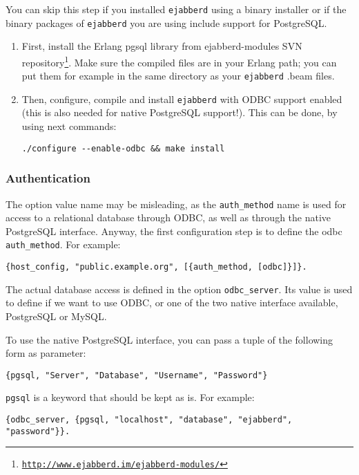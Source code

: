 \documentclass[a4paper,10pt]{book}
\newcommand{\ind}[1]{\begin{latexonly}\index{#1}\end{latexonly}}
\newcommand{\term}[1]{\texttt{#1}}
\newcommand{\ejabberd}{\texttt{ejabberd}}
\gdef\footahref#1#2{#2\footnote{\href{#1}{\texttt{#1}}}}
\begin{document}
You can skip this step if you installed \ejabberd{} using a binary installer or
if the binary packages of \ejabberd{} you are using include support for
PostgreSQL.

\begin{enumerate}
\item First, install the Erlang pgsql library from
  \footahref{http://www.ejabberd.im/ejabberd-modules/}{ejabberd-modules SVN repository}. 
  Make sure the compiled
  files are in your Erlang path; you can put them for example in the same
  directory as your \ejabberd{} .beam files.
\item Then, configure, compile and install \ejabberd{} with ODBC support enabled
  (this is also needed for native PostgreSQL support!). This can be done, by
  using next commands:
  \begin{verbatim}
./configure --enable-odbc && make install
\end{verbatim}
\end{enumerate}

\subsubsection{Authentication}
\label{pgsqlauth}
\ind{PostgreSQL!authentication}

The option value name may be misleading, as the \term{auth\_method} name is used
for access to a relational database through ODBC, as well as through the native
PostgreSQL interface. Anyway, the first configuration step is to define the odbc
\term{auth\_method}. For example:
\begin{verbatim}
{host_config, "public.example.org", [{auth_method, [odbc]}]}.
\end{verbatim}

The actual database access is defined in the option \term{odbc\_server}. Its
value is used to define if we want to use ODBC, or one of the two native
interface available, PostgreSQL or MySQL.

To use the native PostgreSQL interface, you can pass a tuple of the following
form as parameter:
\begin{verbatim}
{pgsql, "Server", "Database", "Username", "Password"}
\end{verbatim}

\term{pgsql} is a keyword that should be kept as is. For example:
\begin{verbatim}
{odbc_server, {pgsql, "localhost", "database", "ejabberd", "password"}}.
\end{verbatim}
\end{document}
